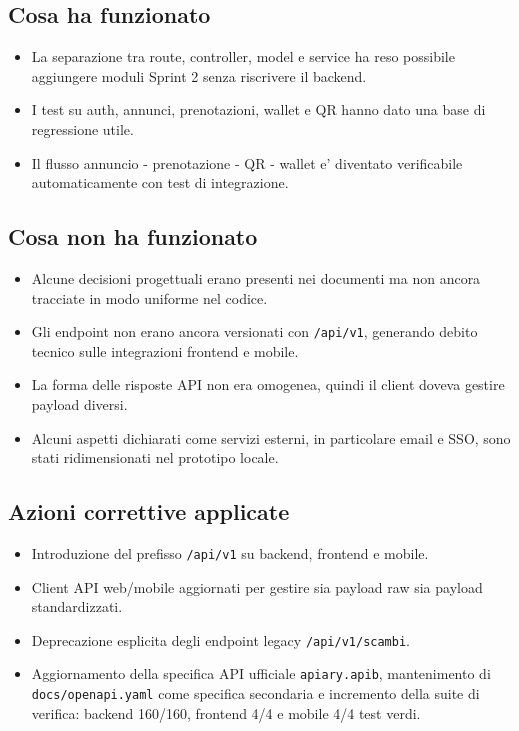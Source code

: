 \documentclass[11pt,a4paper]{article}
\begin{document}
\subsection*{Cosa ha funzionato}

\begin{itemize}
  \item La separazione tra route, controller, model e service ha reso possibile aggiungere moduli Sprint 2 senza riscrivere il backend.
  \item I test su auth, annunci, prenotazioni, wallet e QR hanno dato una base di regressione utile.
  \item Il flusso annuncio - prenotazione - QR - wallet e' diventato verificabile automaticamente con test di integrazione.
\end{itemize}

\subsection*{Cosa non ha funzionato}

\begin{itemize}
  \item Alcune decisioni progettuali erano presenti nei documenti ma non ancora tracciate in modo uniforme nel codice.
  \item Gli endpoint non erano ancora versionati con \texttt{/api/v1}, generando debito tecnico sulle integrazioni frontend e mobile.
  \item La forma delle risposte API non era omogenea, quindi il client doveva gestire payload diversi.
  \item Alcuni aspetti dichiarati come servizi esterni, in particolare email e SSO, sono stati ridimensionati nel prototipo locale.
\end{itemize}

\subsection*{Azioni correttive applicate}

\begin{itemize}
  \item Introduzione del prefisso \texttt{/api/v1} su backend, frontend e mobile.
  \item Client API web/mobile aggiornati per gestire sia payload raw sia payload standardizzati.
  \item Deprecazione esplicita degli endpoint legacy \texttt{/api/v1/scambi}.
  \item Aggiornamento della specifica API ufficiale \texttt{apiary.apib}, mantenimento di \texttt{docs/openapi.yaml} come specifica secondaria e incremento della suite di verifica: backend 160/160, frontend 4/4 e mobile 4/4 test verdi.
\end{itemize}
\end{document}
